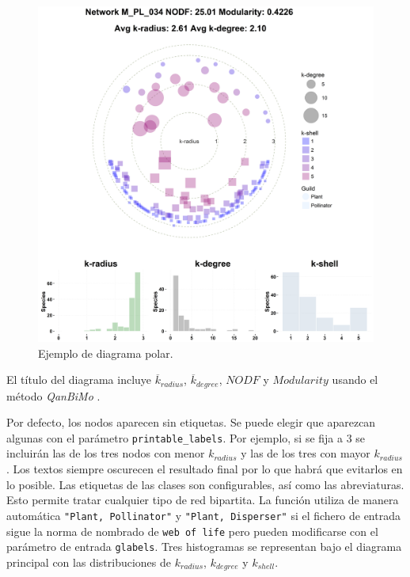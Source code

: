 \begin{figure}[h!]
\centering
\includegraphics[scale=0.41]{ManFigs/M_PL_034_polar.png}
\caption {Ejemplo de diagrama polar.}
\label{fig:AKMAN_M_PL_034_polar}
\end{figure}

El título del diagrama incluye $\overline{k}_{radius}$, $\overline {k}_{degree}$, $NODF$ \cite{almeida2008consistent} y $Modularity$ usando el método \textit{QanBiMo} \cite{dormann2014method}.

Por defecto, los nodos aparecen sin etiquetas. Se puede elegir que aparezcan algunas con el parámetro \texttt{printable\_labels}. Por ejemplo, si se fija a $3$ se incluirán las de los tres nodos con menor ${k}_{radius}$ y las de los tres con mayor ${k}_{radius}$. Los textos siempre oscurecen el resultado final por lo que habrá que evitarlos en lo posible. Las etiquetas de las clases son configurables, así como las abreviaturas. Esto permite tratar cualquier tipo de red bipartita. La función utiliza de manera automática \texttt{"Plant, Pollinator"} y \texttt{"Plant, Disperser"} si el fichero de entrada sigue la norma de nombrado de \texttt{web of life} pero pueden modificarse con el parámetro de entrada \texttt{glabels}. Tres histogramas se representan bajo el diagrama principal con las distribuciones de $k_{radius}$, $k_{degree}$ y $k_{shell}$. 

